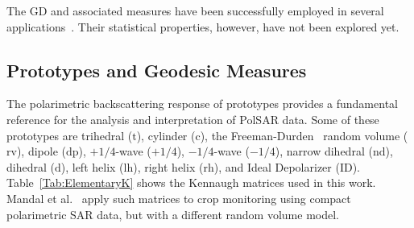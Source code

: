 \documentclass[journal]{IEEEtran}
\begin{document}
	The GD and associated measures have been successfully employed in several applications~\cite{ClassificationPolSARGeodesic,AGeneralizedVolumeScatteringModelBasedVegetationIndexfromPolarimetricSARData2019,NovelTechniquesforBuiltupAreaExtractionfromPolarimetricSARImages2019,APolSARScatteringPowerFactorizationFrameworkandNovelRollInvariantParametersBasedUnsupervisedClassificationSchemeUsingaGeodesicDistanceinpress,ChangeDetectionPolSARGeodesicDistanceBetweenScatteringMechanisms,ARadarVegetationIndexforCropMonitoringUsingCompactPolarimetricSARData}. Their statistical properties, however, have not been explored yet.
	
	\subsection{Prototypes and Geodesic Measures}
	
	The polarimetric backscattering response of prototypes provides a fundamental reference for the analysis and interpretation of PolSAR data.
	Some of these prototypes are
	{trihedral} ($\text{t}$),
	{cylinder} (${\text{c}}$),
	the Freeman-Durden~\cite{freeman98} random volume (${\text{rv}}$),
	{dipole} (${\text{dp}}$),
	{$+1/4$-wave} (${+1/4}$), 
	{$-1/4$-wave} (${-1/4}$),
	{narrow dihedral} (${\text{nd}}$),
	{dihedral} (${\text{d}}$),
	{left helix} (${\text{lh}}$), 
	{right helix} (${\text{rh}}$), 
	and Ideal Depolarizer (${\text{ID}}$).
	Table~\ref{Tab:ElementaryK} shows the Kennaugh matrices used in this work. 
	Mandal et al.~\cite{ARadarVegetationIndexforCropMonitoringUsingCompactPolarimetricSARData} apply such matrices to crop monitoring using compact polarimetric SAR data, but with a different random volume model.
	
\end{document}
